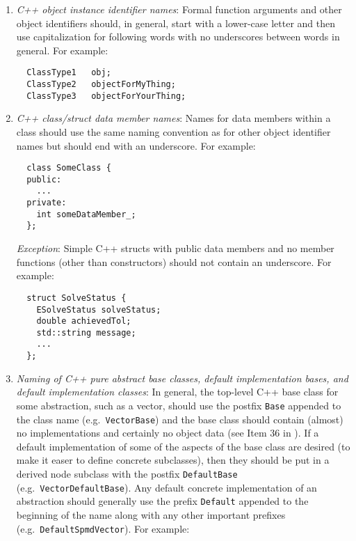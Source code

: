 \begin{enumerate}
{}\item\textit{C++ object instance identifier names}: Formal function
arguments and other object identifiers should, in general, start with a
lower-case letter and then use capitalization for following words with no
underscores between words in general.  For example:

{\small\begin{verbatim}
  ClassType1   obj;
  ClassType2   objectForMyThing;
  ClassType3   objectForYourThing;
\end{verbatim}}

{}\item\textit{C++ class/struct data member names}: Names for data members
within a class should use the same naming convention as for other object
identifier names but should end with an underscore.  For example:

{\small\begin{verbatim}
  class SomeClass {
  public:
    ...
  private:
    int someDataMember_;
  };
\end{verbatim}}

{}\textit{Exception}: Simple C++ structs with public data members and no
member functions (other than constructors) should not contain an underscore.
For example:

{\small\begin{verbatim}
  struct SolveStatus {
    ESolveStatus solveStatus;
    double achievedTol;
    std::string message;
    ...
  };
\end{verbatim}}

{}\item\textit{Naming of C++ pure abstract base classes, default
implementation bases, and default implementation classes}: In general, the
top-level C++ base class for some abstraction, such as a vector, should use
the postfix {}\texttt{Base} appended to the class name (e.g.\
{}\texttt{Vector\-Base}) and the base class should contain (almost) no
implementations and certainly no object data (see Item 36 in
{}\cite{C++CodingStandards05}).  If a default implementation of some of the
aspects of the base class are desired (to make it easer to define concrete
subclasses), then they should be put in a derived node subclass with the
postfix {}\texttt{DefaultBase} (e.g.\ {}\texttt{Vector\-Default\-Base}).  Any
default concrete implementation of an abstraction should generally use the
prefix {}\texttt{Default} appended to the beginning of the name along with any
other important prefixes (e.g.\ {}\texttt{DefaultSpmdVector}).  For example:


\end{enumerate}
